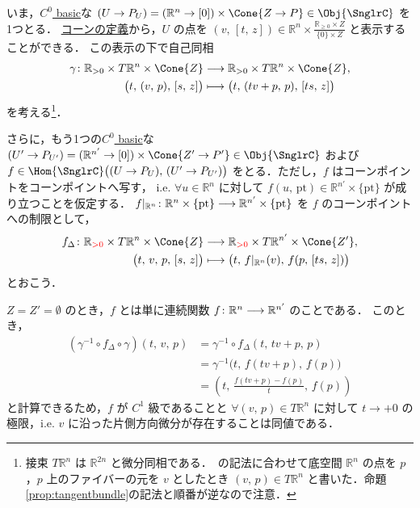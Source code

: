 \documentclass[TQFT_main]{subfiles}
\begin{document}
いま，\hyperref[def:C0-basic]{$C^0$ basic}な $(U \to P_U) = (\mathbb{R}^n \to [0]) \times \Cone{Z \to P} \in \Obj{\SnglrC}$ を1つとる．
\hyperref[def:str-cone]{コーンの定義}から，$U$ の点を $(v,\, [t,\, z]) \in \mathbb{R}^n \times \frac{\mathbb{R}_{\ge 0} \times Z}{\{0\} \times Z}$ と表示することができる．
この表示の下で自己同相
\begin{align}
    \gamma \colon \mathbb{R}_{> 0} \times T \mathbb{R}^n \times \Cone{Z} &\lto \mathbb{R}_{> 0} \times T \mathbb{R}^n \times \Cone{Z}, \\
    \bigl( t,\, (v,\, p),\, [s,\, z] \bigr) &\lmto \bigl( t,\, (tv + p,\, p),\, [ts,\, z] \bigr)
\end{align}
を考える\footnote{接束 $T\mathbb{R}^n$ は $\mathbb{R}^{2n}$ と微分同相である．~\cite[p.23]{AFT2014stratified}の記法に合わせて底空間 $\mathbb{R}^n$ の点を $p$，$p$ 上のファイバーの元を $v$ としたとき $(v,\, p) \in T \mathbb{R}^n$ と書いた．命題\ref{prop:tangentbundle}の記法と順番が逆なので注意．}．

さらに，もう1つの\hyperref[def:C0-basic]{$C^0$ basic}な $(U' \to P_{U'}) = (\mathbb{R}^{n'} \to [0]) \times \Cone{Z' \to P'} \in \Obj{\SnglrC}$ および
$f \in \Hom{\SnglrC} \bigl( (U \to P_{U}),\, (U' \to P_{U'})  \bigr)$ をとる．ただし，$f$ はコーンポイントをコーンポイントへ写す，
i.e. $\forall u \in \mathbb{R}^n$ に対して $f (u,\, \mathrm{pt}) \in \mathbb{R}^{n'} \times \{\mathrm{pt}\}$ が成り立つことを仮定する．
$f|_{\mathbb{R}^n} \colon \mathbb{R}^n \times \{\mathrm{pt}\} \longrightarrow \mathbb{R}^{n'} \times \{\mathrm{pt}\}$ を $f$ のコーンポイントへの制限として，
\begin{align}
    f_{\Delta} \colon \mathbb{R}_{\textcolor{red}{>0}} \times T \mathbb{R}^n \times \Cone{Z} &\lto \mathbb{R}_{\textcolor{red}{>0}} \times T \mathbb{R}^{n'} \times \Cone{Z'}, \\
    \bigl( t,\, v,\, p,\, [s,\, z] \bigr) &\lmto \bigl( t,\, f|_{\mathbb{R}^n}(v),\, f(p,\, [ts,\, z]) \bigr)
\end{align}
とおこう．

\begin{myexample}[label=ex:cone-diff]{}
    $Z = Z' = \emptyset$ のとき，$f$ とは単に連続関数 $f \colon \mathbb{R}^n \longrightarrow \mathbb{R}^{n'}$ のことである．
    このとき，
    \begin{align}
        (\gamma^{-1} \circ f_{\Delta} \circ \gamma)(t,\, v,\, p)
        &= \gamma^{-1} \circ f_\Delta (t,\, tv+p,\, p) \\
        &= \gamma^{-1} \bigl(t,\, f(tv+p),\, f(p)\bigr) \\
        &= \left( t,\, \frac{f(tv+p) - f(p)}{t},\, f(p) \right)
    \end{align}
    と計算できるため，$f$ が $C^1$ 級であることと $\forall (v,\, p) \in T \mathbb{R}^n$ に対して $t \to +0$ の極限，i.e. $v$ に沿った片側方向微分が存在することは同値である．
\end{myexample}
\end{document}
